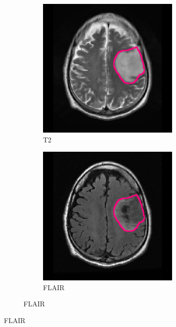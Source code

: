 \begin{subappendices}
\begin{figure}[htbp]
\begin{subfigure}[b]{0.95\textwidth}
\begin{subfigure}[b]{0.215\textwidth}
        \end{subfigure}
        \hfill
        \begin{subfigure}[b]{0.215\textwidth}
        \caption*{\acrshort{T2}}
        \includegraphics[width=\textwidth, clip, trim=2.5cm 0.5cm 2.5cm 0.5cm]{Figures/Random_segs/T2_TCGA-DU-7301.png}
        \end{subfigure}
        \hfill
        \begin{subfigure}[b]{0.215\textwidth}
        \caption*{\acrshort{FLAIR}}
        \includegraphics[width=\textwidth, clip, trim=2.5cm 0.5cm 2.5cm 0.5cm]{Figures/Random_segs/FLAIR_TCGA-DU-7301.png}

\end{subfigure}
\end{subfigure}
\end{figure}
\end{subappendices}
